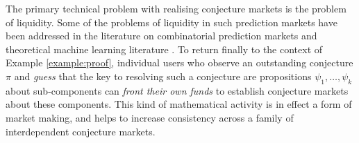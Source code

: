 \documentclass[english,letter paper,12pt,reqno]{article}
\theoremstyle{example}
\begin{document}
The primary technical problem with realising conjecture markets is the problem of liquidity. Some of the problems of liquidity in such prediction markets have been addressed in the literature on combinatorial prediction markets \cite{hanson,chen,dudik,pennock, dudik} and theoretical machine learning literature \cite{garrabrant}. To return finally to the context of Example \ref{example:proof}, individual users who observe an outstanding conjecture $\pi$ and \emph{guess} that the key to resolving such a conjecture are propositions $\psi_1,\ldots,\psi_k$ about sub-components can \emph{front their own funds} to establish conjecture markets about these components. This kind of mathematical activity is in effect a form of market making, and helps to increase consistency across a family of interdependent conjecture markets.
\end{document}
